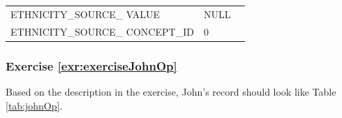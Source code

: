 \documentclass[11pt]{book}
\theoremstyle{definition}
\theoremstyle{definition}
\theoremstyle{definition}
\theoremstyle{remark}
\begin{document}
\begin{longtable}[]{@{}lll@{}}
\begin{minipage}[t]{0.28\columnwidth}
ETHNICITY\_SOURCE\_ VALUE\strut
\end{minipage} & \begin{minipage}[t]{0.16\columnwidth}\raggedright\strut
NULL\strut
\end{minipage} & \begin{minipage}[t]{0.48\columnwidth}\raggedright\strut
\strut
\end{minipage}\tabularnewline
\begin{minipage}[t]{0.28\columnwidth}\raggedright\strut
ETHNICITY\_SOURCE\_ CONCEPT\_ID\strut
\end{minipage} & \begin{minipage}[t]{0.16\columnwidth}\raggedright\strut
0\strut
\end{minipage} & \begin{minipage}[t]{0.48\columnwidth}\raggedright\strut
\strut
\end{minipage}\tabularnewline
\bottomrule
\end{longtable}

\subsubsection*{Exercise
\ref{exr:exerciseJohnOp}}\label{exercise-refexrexercisejohnop}

Based on the description in the exercise, John's record should look like
Table \ref{tab:johnOp}.
\end{document}
